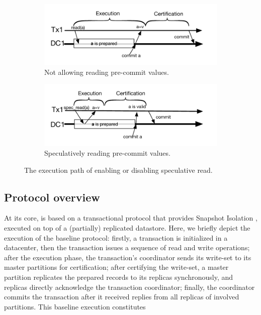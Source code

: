 \begin{figure}[t]
\centering
\begin{subfigure}[t!]{0.95\linewidth}
\def\svgwidth{0.95\columnwidth}
\centering \includegraphics[scale = 0.55]{figures/NoSpeculativeRead}
\vspace{-4mm}
\caption{\footnotesize Not allowing reading pre-commit values.}
\label{fig:remote:a}
\end{subfigure}

\begin{subfigure}[t!]{0.95\linewidth}
\vspace{1mm}
\def\svgwidth{0.95\columnwidth}
\centering \includegraphics[scale = 0.55]{figures/YesSpeculativeRead}%
\vspace{-4mm}
\caption{\footnotesize Speculatively reading pre-commit values.}
\label{fig:remote:b}
\end{subfigure}
\caption{\small The execution path of enabling or disabling speculative read.}
\label{fig:specularead}
\end{figure}
\fi


\subsection{Protocol overview}
\label{sub:overview}
At its core, {\specula} is based on a transactional protocol that provides Snapshot Isolation \cite{clocksi, ports2012serializable}, executed on top of a (partially) replicated datastore. Here, we briefly depict the execution of the baseline protocol: firstly, a transaction is initialized in a datacenter, then the transaction issues a sequence of read and write operations; after the execution phase, the transaction's coordinator sends its write-set to its master partitions for certification; after certifying the write-set, a master partition replicates the prepared records to its replicas synchronously, and replicas directly acknowledge the transaction coordinator; finally, the coordinator commits the transaction after it received replies from all replicas of involved partitions. This baseline execution constitutes 

